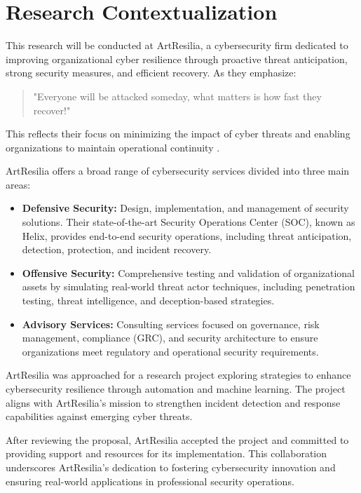 \section{Research Contextualization}

This research will be conducted at ArtResilia, a cybersecurity firm dedicated to improving organizational cyber resilience through proactive threat anticipation, strong security measures, and efficient recovery.
As they emphasize: 

\begin{quote}
    "Everyone will be attacked someday, what matters is how fast they recover!"  
\end{quote}

This reflects their focus on minimizing the impact of cyber threats and enabling organizations to maintain operational continuity \parencite{artresilia2024}.

ArtResilia offers a broad range of cybersecurity services divided into three main areas:
\begin{itemize}
    \item \textbf{Defensive Security:} Design, implementation, and management of security solutions. Their state-of-the-art Security Operations Center (SOC), known as Helix, provides end-to-end security operations, including threat anticipation, detection, protection, and incident recovery.
    \item \textbf{Offensive Security:} Comprehensive testing and validation of organizational assets by simulating real-world threat actor techniques, including penetration testing, threat intelligence, and deception-based strategies.
    \item \textbf{Advisory Services:} Consulting services focused on governance, risk management, compliance (GRC), and security architecture to ensure organizations meet regulatory and operational security requirements.
\end{itemize}

ArtResilia was approached for a research project exploring strategies to enhance cybersecurity resilience through automation and machine learning. The project aligns with ArtResilia's mission to strengthen incident detection and response capabilities against emerging cyber threats.

After reviewing the proposal, ArtResilia accepted the project and committed to providing support and resources for its implementation. This collaboration underscores ArtResilia's dedication to fostering cybersecurity innovation and ensuring real-world applications in professional security operations.

